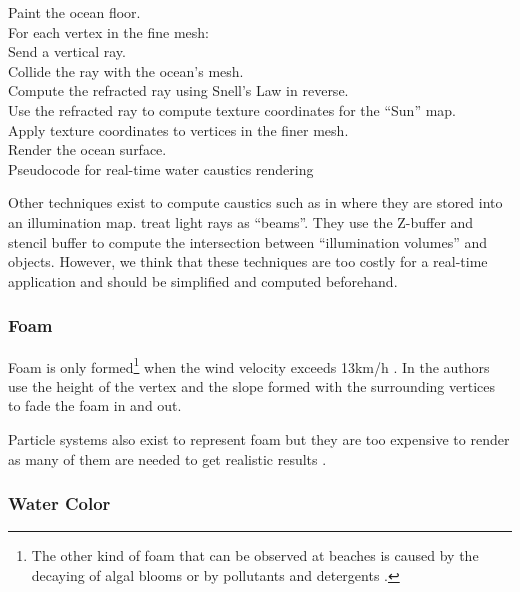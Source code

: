 \begin{algorithm}
    \small
    \DontPrintSemicolon{}
    Paint the ocean floor.\\
    For each vertex in the fine mesh:\\
    \Indp{}
        Send a vertical ray.\\
        Collide the ray with the ocean's mesh.\\
        Compute the refracted ray using Snell's Law in reverse.\\
        Use the refracted ray to compute texture coordinates for the ``Sun''
        map.\\
        Apply texture coordinates to vertices in the finer mesh.\\
    \Indm{}
    Render the ocean surface.\\
    \caption{\small{Pseudocode for real-time water caustics rendering
    \autocite[Chapter~2]{fernando2004gpu}}}\label{algo:caustics}
\end{algorithm}

Other techniques exist \autocite{darles2011survey} to compute caustics such as
in \autocite{arvo1986backward} where they are stored into an illumination map.
\citeauthor{iwasaki2001efficient} treat light rays as
``beams''\autocite{heckbert1984beam,watt1990light}. They use the Z-buffer and
stencil buffer to compute the intersection between ``illumination volumes'' and
objects. However, we think that these techniques are too costly for a
real-time application and should be simplified and computed beforehand. 

\subsubsection{Foam}\label{subsub:foam}

Foam is only formed\footnote{The other kind of foam that can be observed at
beaches is caused by the decaying of algal blooms or by pollutants and
detergents \autocite{noaa2017what}.} when the wind velocity exceeds 13km/h
\autocite{munk1947critical, darles2011survey}. In
\autocite{jensen2001deep,jeschke2003procedural} the authors use the height of
the vertex and the slope formed with the surrounding vertices to fade the foam
in and out.

Particle systems also exist to represent foam but they are too expensive to
render as many of them are needed to get realistic results
\autocite{darles2011survey}.

\subsubsection{Water Color}\label{subsub:water_color}

